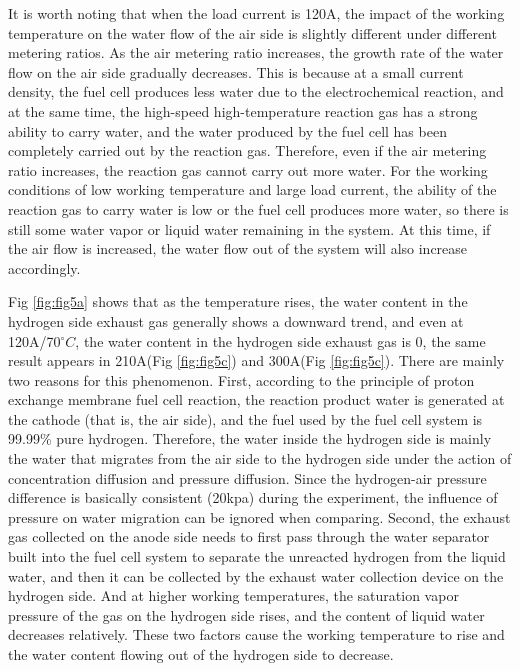 \par
It is worth noting that when the load current is 120A, the impact of the working temperature on the water flow of the air side is slightly different under different metering ratios. As the air metering ratio increases, the growth rate of the water flow on the air side gradually decreases. This is because at a small current density, the fuel cell produces less water due to the electrochemical reaction, and at the same time, the high-speed high-temperature reaction gas has a strong ability to carry water, and the water produced by the fuel cell has been completely carried out by the reaction gas. Therefore, even if the air metering ratio increases, the reaction gas cannot carry out more water. For the working conditions of low working temperature and large load current, the ability of the reaction gas to carry water is low or the fuel cell produces more water, so there is still some water vapor or liquid water remaining in the system. At this time, if the air flow is increased, the water flow out of the system will also increase accordingly.
\par
Fig \ref{fig:fig5a} shows that as the temperature rises, the water content in the hydrogen side exhaust gas generally shows a downward trend, and even at 120A/70$^{\circ}C$, the water content in the hydrogen side exhaust gas is 0, the same result appears in 210A(Fig \ref{fig:fig5c}) and 300A(Fig \ref{fig:fig5c}). There are mainly two reasons for this phenomenon.  First, according to the principle of proton exchange membrane fuel cell reaction, the reaction product water is generated at the cathode (that is, the air side), and the fuel used by the fuel cell system is 99.99\% pure hydrogen. Therefore, the water inside the hydrogen side is mainly the water that migrates from the air side to the hydrogen side under the action of concentration diffusion and pressure diffusion. Since the hydrogen-air pressure difference is basically consistent (20kpa) during the experiment, the influence of pressure on water migration can be ignored when comparing. Second, the exhaust gas collected on the anode side needs to first pass through the water separator built into the fuel cell system to separate the unreacted hydrogen from the liquid water, and then it can be collected by the exhaust water collection device on the hydrogen side. And at higher working temperatures, the saturation vapor pressure of the gas on the hydrogen side rises, and the content of liquid water decreases relatively. These two factors cause the working temperature to rise and the water content flowing out of the hydrogen side to decrease.
